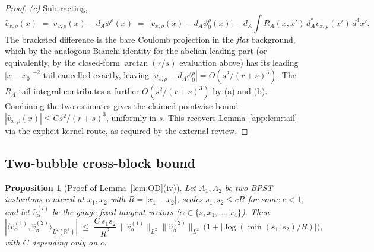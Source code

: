 \documentclass[11pt,letterpaper]{article}
\newtheorem{proposition}[theorem]{Proposition}
\theoremstyle{definition}
\newcommand{\bbR}{\mathbb{R}}
\begin{document}
\begin{proof}
\emph{(c)} Subtracting,
\[
\hat v_{x,\rho}(x) \;=\; v_{x,\rho}(x) - d_A\phi^\rho(x) \;=\; \bigl[v_{x,\rho}(x) - d_A\phi_0^\rho(x)\bigr] - d_A\!\!\int R_A(x,x')\,d_A^* v_{x,\rho}(x')\,d^4x'.
\]
The bracketed difference is the bare Coulomb projection in the \emph{flat} background, which by the analogous Bianchi identity for the abelian-leading part (or equivalently, by the closed-form $\arctan(r/s)$ evaluation above) has its leading $|x-x_0|^{-2}$ tail cancelled exactly, leaving $|v_{x,\rho} - d_A\phi_0^\rho| = O(s^2/(r+s)^3)$. The $R_A$-tail integral contributes a further $O(s^2/(r+s)^3)$ by (a) and (b). Combining the two estimates gives the claimed pointwise bound $|\hat v_{x,\rho}(x)|\le C s^2/(r+s)^3$, uniformly in $s$. This recovers Lemma~\ref{app:lem:tail} via the explicit kernel route, as required by the external review.
\end{proof}

\subsection{Two-bubble cross-block bound}\label{app:sec:cross}

\begin{proposition}[Proof of Lemma~\ref{lem:OD}(iv)]\label{app:prop:cross}
Let $A_1, A_2$ be two BPST instantons centered at $x_1, x_2$ with $R = |x_1 - x_2|$, scales $s_1, s_2 \le c R$ for some $c < 1$, and let $\hat v_\alpha^{(i)}$ be the gauge-fixed tangent vectors ($\alpha \in \{s, x_1,\ldots,x_4\}$). Then
\[
|\langle \hat v_\alpha^{(1)},\hat v_\beta^{(2)}\rangle_{L^2(\bbR^4)}| \;\le\; \frac{C\, s_1 s_2}{R^2}\,\|\hat v_\alpha^{(1)}\|_{L^2}\|\hat v_\beta^{(2)}\|_{L^2}\,\bigl(1+|\log(\min(s_1,s_2)/R)|\bigr),
\]
with $C$ depending only on $c$.
\end{proposition}
\end{document}
